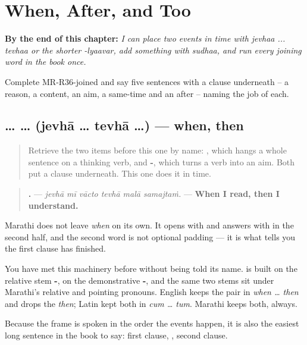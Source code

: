 
\chapter{When, After, and Too}
\label{ch:mr-time-joins}

\begin{chapteropening}
\textbf{By the end of this chapter:} \emph{I can place two events in time with jevhaa ... tevhaa or the shorter -lyaavar, add something with sudhaa, and run every joining word in the book once.}

Complete MR-R36-joined and say five sentences with a clause underneath -- a reason, a content, an aim, a same-time and an after -- naming the job of each.
\end{chapteropening}

\section[\texorpdfstring{\mr{जेव्हा} … \mr{तेव्हा} … (jevhā … tevhā …)}{जेव्हा … तेव्हा … (jevhā … tevhā …)}]{ …  … (jevhā … tevhā …) — when, then}

\label{lesson:MR-C36-jevha}



\begin{quote}
Retrieve the two items before this one by name: \textbf{}, which hangs a whole sentence on a thinking verb, and \textbf{-}, which turns a verb into an aim. Both put a clause underneath. This one does it in time.
\end{quote}

\begin{grammarlens}[title={Grammar Lens: the two-word frame}]
\begin{quote}
\textbf{     .} — \emph{jevhā mī vācto tevhā malā samajtaṁ.} — \textbf{When I read, then I understand.}
\end{quote}

Marathi does not leave \emph{when} on its own. It opens with \textbf{} and answers with \textbf{} in the second half, and the second word is not optional padding — it is what tells you the first clause has finished.

You have met this machinery before without being told its name. \textbf{} is built on the relative stem \textbf{-}, \textbf{} on the demonstrative \textbf{-}, and the same two stems sit under Marathi's relative and pointing pronouns. English keeps the pair in \emph{when … then} and drops the \emph{then}; Latin kept both in \emph{cum … tum}. Marathi keeps both, always.

Because the frame is spoken in the order the events happen, it is also the easiest long sentence in the book to say: first clause, \textbf{}, second clause.
\end{grammarlens}

